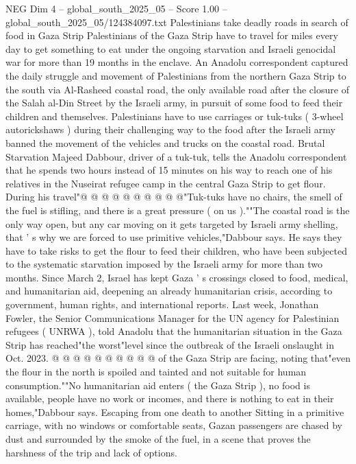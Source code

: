 \begin{textsample}{NEG Dim 4 – global\_south\_2025\_05 – Score 1.00 – global\_south\_2025\_05/124384097.txt}  \label{ex:f4_neg_367}
Palestinians take deadly roads in search of food in Gaza Strip Palestinians of the Gaza Strip have to travel for miles every day to get something to eat under the ongoing starvation and Israeli genocidal war for more than 19 months in the enclave.
An Anadolu correspondent captured the daily struggle and movement of Palestinians from the northern Gaza Strip to the south via Al-Rasheed coastal road, the only available road after the closure of the Salah al-Din Street by the Israeli army, in pursuit of some food to feed their children and themselves.
Palestinians have to use carriages or tuk-tuks ( 3-wheel autorickshaws ) during their challenging way to the food after the Israeli army banned the movement of the vehicles and trucks on the coastal road.
Brutal Starvation Majeed Dabbour, driver of a tuk-tuk, tells the Anadolu correspondent that he spends two hours instead of 15 minutes on his way to reach one of his relatives in the Nuseirat refugee camp in the central Gaza Strip to get flour.
During his travel"@ @ @ @ @ @ @ @ @ @"Tuk-tuks have no chairs, the smell of the fuel is stifling, and there is a great pressure ( on us ).""The coastal road is the only way open, but any car moving on it gets targeted by Israeli army shelling, that ' s why we are forced to use primitive vehicles,"Dabbour says.
He says they have to take risks to get the flour to feed their children, who have been subjected to the systematic starvation imposed by the Israeli army for more than two months.
Since March 2, Israel has kept Gaza ' s crossings closed to food, medical, and humanitarian aid, deepening an already humanitarian crisis, according to government, human rights, and international reports.
Last week, Jonathan Fowler, the Senior Communications Manager for the UN agency for Palestinian refugees ( UNRWA ), told Anadolu that the humanitarian situation in the Gaza Strip has reached"the worst"level since the outbreak of the Israeli onslaught in Oct. 2023. @ @ @ @ @ @ @ @ @ @ of the Gaza Strip are facing, noting that"even the flour in the north is spoiled and tainted and not suitable for human consumption.""No humanitarian aid enters ( the Gaza Strip ), no food is available, people have no work or incomes, and there is nothing to eat in their homes,"Dabbour says.
Escaping from one death to another Sitting in a primitive carriage, with no windows or comfortable seats, Gazan passengers are chased by dust and surrounded by the smoke of the fuel, in a scene that proves the harshness of the trip and lack of options.

\end{textsample}
